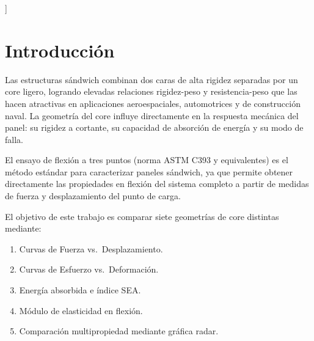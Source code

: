 \documentclass[12pt, a4paper, twocolumn]{article}
\begin{document}
  \begin{abstract}
  Se presenta un análisis comparativo del comportamiento mecánico en flexión a tres
  puntos de paneles sándwich fabricados con siete geometrías de core distintas: Carritos,
  Panal, 1\_cp, 2\_ca, 3\_pa, Hexagonal y Lluvia. A partir de los datos brutos
  registrados por una máquina universal de ensayos, se procesaron las curvas de Fuerza
  vs.\ Desplazamiento mediante Python (pandas, NumPy, Matplotlib), se calcularon las
  curvas de Esfuerzo vs.\ Deformación según la teoría de flexión a tres puntos, la
  energía absorbida por integración trapezoidal, la absorción de energía específica por
  volumen (SEA) y el módulo de elasticidad en flexión por regresión lineal de la zona
  elástica. Los resultados muestran diferencias significativas en rigidez, resistencia y
  capacidad de absorción de energía entre geometrías, siendo 2\_ca la geometría más
  eficiente en SEA y Hexagonal la de mayor esfuerzo máximo normalizado.
  \end{abstract}
  \vspace{1.5em}
]

\section{Introducción}

Las estructuras sándwich combinan dos caras de alta rigidez separadas por un core
ligero, logrando elevadas relaciones rigidez-peso y resistencia-peso que las hacen
atractivas en aplicaciones aeroespaciales, automotrices y de construcción naval. La
geometría del core influye directamente en la respuesta mecánica del panel: su rigidez
a cortante, su capacidad de absorción de energía y su modo de falla.

El ensayo de flexión a tres puntos (norma ASTM C393 y equivalentes) es el método
estándar para caracterizar paneles sándwich, ya que permite obtener directamente las
propiedades en flexión del sistema completo a partir de medidas de fuerza y
desplazamiento del punto de carga.

El objetivo de este trabajo es comparar siete geometrías de core distintas mediante:
\begin{enumerate}
    \item Curvas de Fuerza vs.\ Desplazamiento.
    \item Curvas de Esfuerzo vs.\ Deformación.
    \item Energía absorbida e índice SEA.
    \item Módulo de elasticidad en flexión.
    \item Comparación multipropiedad mediante gráfica radar.
\end{enumerate}
\end{document}
